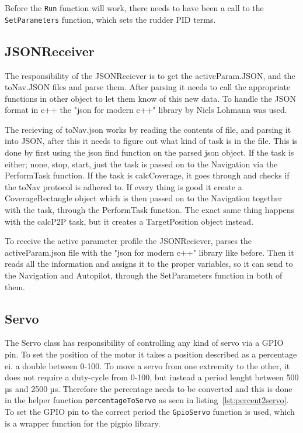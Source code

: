 Before the \texttt{Run} function will work, there needs to have been a call to the \texttt{SetParameters} function, which sets the rudder PID terms. 

\subsection{JSONReceiver}
The responsibility of the JSONReciever is to get the activeParam.JSON, and the toNav.JSON files and parse them. After parsing it needs to call the appropriate functions in other object to let them know of this new data. To handle the JSON format in c++ the "json for modern c++" library by Niels Lohmann was used\cite{json}. 

The recieving of toNav.json works by reading the contents of file, and parsing it into JSON, after this it needs to figure out what kind of task is in the file. This is done by first using the json find function on the parsed json object. If the task is either; none, stop, start, just the task is passed on to the Navigation via the PerformTask function. If the task is calcCoverage, it goes through and checks if the toNav protocol is adhered to. If every thing is good it create a CoverageRectangle object which is then passed on to the Navigation together with the task, through the PerformTask function.
The exact same thing happens with the calcP2P task, but it creates a TargetPosition object instead.

To receive the active parameter profile the JSONReciever, parses the activeParam.json file with the "json for modern c++" library like before. Then it reads all the information and assigns it to the proper variables, so it can send to the Navigation and Autopilot, through the SetParameters function in both of them.

\subsection{Servo}
The Servo class has responsibility of controlling any kind of servo via a GPIO pin. To set the position of the motor it takes a position described as a percentage ei. a double between 0-100. To move a servo from one extremity to the other, it does not require a duty-cycle from 0-100, but instead a period lenght between 500 µs and 2500 µs\cite{pigpio}. Therefore the percentage needs to be converted and this is done in the helper function \texttt{percentageToServo} as seen in listing~\ref{lst:percent2servo}. To set the GPIO pin to the correct period the \texttt{GpioServo} function is used, which is a wrapper function for the pigpio library\cite{pigpio}.

